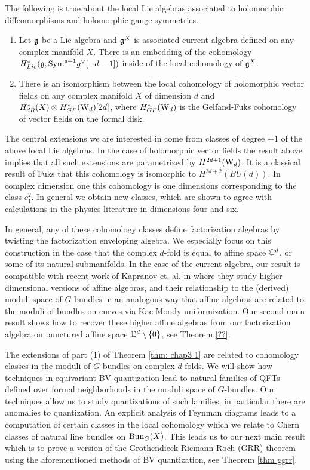 \documentclass[10pt]{amsart}
\begin{document}
\begin{thm}\label{thm: chap3 1}
The following is true about the local Lie algebras associated to holomorphic diffeomorphisms and holomorphic gauge symmetries.
\begin{enumerate}
\item Let $\mathfrak g$ be a Lie algebra and $\mathfrak g^X$ is associated current algebra defined on any complex manifold $X$. 
There is an embedding of the cohomology $H^*_{Lie}(\mathfrak g , {\rm Sym}^{d+1} g^\vee [-d-1])$ inside of the local cohomology of $\mathfrak g^X$.
\item There is an isomorphism between the local cohomology of holomorphic vector fields on any complex manifold $X$ of dimension $d$ and $H_{dR}^*(X) \otimes H^*_{GF}({\rm W}_d)[2d]$, where  $H^*_{GF}({\rm W}_d)$ is the Gelfand-Fuks cohomology of vector fields on the formal disk.
\end{enumerate}
\end{thm}

The central extensions we are interested in come from classes of degree $+1$ of the above local Lie algebras.
In the case of holomorphic vector fields the result above implies that all such extensions are parametrized by $H^{2d+1}({\rm W}_d)$. 
It is a classical result of Fuks \cite{Fuks} that this cohomology is isomorphic to $H^{2d+2}(BU(d))$. 
In complex dimension one this cohomology is one dimensions corresponding to the class $c_1^2$. 
In general we obtain new classes, which are shown to agree with calculations in the physics 
literature in dimensions four and six. 

In general, any of these cohomology classes define factorization algebras by twisting the factorization enveloping algebra. 
We especially focus on this construction in the case that the complex $d$-fold is equal to affine space $\mathbb C^d$, or some of its natural submanifolds.
In the case of the current algebra, our result is compatible with recent work of Kapranov et. al. in \cite{FHK} where they study higher dimensional versions of affine algebras, and their relationship to the (derived) moduli space of $G$-bundles in an analogous way that affine algebras are related to the moduli of bundles on curves via Kac-Moody uniformization.  
Our second main result shows how to recover these higher affine algebras from our factorization algebra on punctured affine space $\mathbb C^d \setminus\{0\}$, see Theorem \ref{??}.

The extensions of part (1) of Theorem \ref{thm: chap3 1} are related to cohomology classes in the moduli of $G$-bundles on complex $d$-folds.
We will show how techniques in equivariant BV quantization lead to natural families of QFTs defined over formal neighborhoods in the moduli space of $G$-bundles. 
Our techniques allow us to study quantizations of such families, in particular there are anomalies to quantization. 
An explicit analysis of Feynman diagrams leads to a computation of certain classes in the local cohomology which we relate to Chern classes of natural line bundles on ${\rm Bun}_G(X)$.
This leads us to our next main result which is to prove a version of the Grothendieck-Riemann-Roch (GRR) theorem using the aforementioned methods of BV quantization, see Theorem \ref{thm ggrr}.
\end{document}
